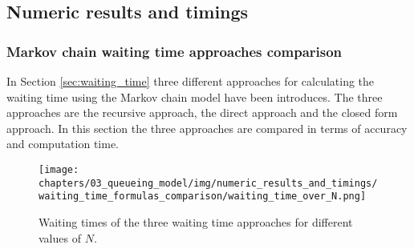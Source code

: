 \subsection{Numeric results and timings}\label{sec:truncation_effect}



\subsubsection{Markov chain waiting time approaches comparison}
\label{sec:waiting_time_approach_comparison}

In Section \ref{sec:waiting_time} three different approaches for calculating
the waiting time using the Markov chain model have been introduces.
The three approaches are the recursive approach, the direct approach and
the closed form approach.
In this section the three approaches are compared in terms of accuracy and
computation time.



\begin{figure}[H]
    \texttt{[image: chapters/03\_queueing\_model/img/numeric\_results\_and\_timings/waiting\_time\_formulas\_comparison/waiting\_time\_over\_N.png]}
    \caption{Waiting times of the three waiting time approaches for different
    values of \(N\).}
    \label{fig:waiting_time_accuracy_over_N}
\end{figure}
    




